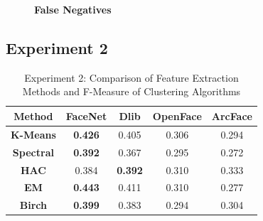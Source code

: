 \documentclass[12pt,english]{article}
\begin{document}
\begin{figure}[H]
\begin{minipage}[b]{0.4\textwidth}
    \caption{\textbf{False Negatives}}
    \label{fig:ex1fn}
  \end{minipage}
\end{figure}

\subsection{Experiment 2}

\begin{table}[H]
\centering
\begin{tabular}{||c c c c c||} 
 \hline
Method & FaceNet & Dlib & OpenFace & ArcFace\\ [0.5ex]
 \hline\hline
 \textbf{K-Means} & \textbf{0.426} & 0.405 & 0.306 & 0.294\\ 
 \hline
  \textbf{Spectral} & \textbf{0.392} & 0.367 & 0.295 & 0.272\\
 \hline
 \textbf{HAC} & 0.384 & \textbf{0.392} & 0.310 & 0.333\\
 \hline
 \textbf{EM} & \textbf{0.443} & 0.411 & 0.310 & 0.277\\
 \hline
 \textbf{Birch} & \textbf{0.399} & 0.383 & 0.294 & 0.304\\
 \hline
\end{tabular}
\caption{Experiment 2: Comparison of Feature Extraction Methods and F-Measure of Clustering Algorithms}
\label{table:ex2}
\end{table}
\end{document}
